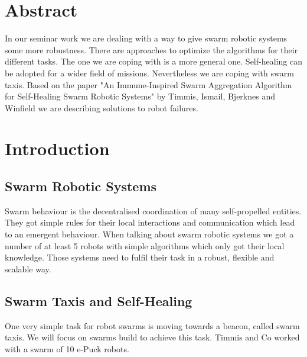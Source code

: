\documentclass[
	a4paper,
	article,
	pagesize,
	pdftex,
	12pt,
	english,
	fleqn,
	final,
	]{scrartcl}
\begin{document}

\makeTitel

\tableofcontents
\clearpage

\section{Abstract}
In our seminar work we are dealing with a way to give swarm robotic systems some more robustness. There are approaches to optimize the algorithms for their different tasks. The one we are coping with is a more general one. Self-healing can be adopted for a wider field of missions. Nevertheless we are coping with swarm taxis. Based on the paper "An Immune-Inspired Swarm Aggregation Algorithm for Self-Healing Swarm Robotic Systems" by Timmis, Ismail, Bjerknes and Winfield we are describing solutions to robot failures.

\section{Introduction}

\subsection{Swarm Robotic Systems}
Swarm behaviour is the decentralised coordination of many self-propelled entities. They got simple rules for their local interactions and communication which lead to an emergent behaviour. 
When talking about swarm robotic systems we got a number of at least 5 robots with simple algorithms which only got their local knowledge.
Those systems need to fulfil their task in a robust, flexible and scalable way.

\subsection{Swarm Taxis and Self-Healing}
One very simple task for robot swarms is moving towards a beacon, called swarm taxis. We will focus on swarms build to achieve this task. Timmis and Co worked with a swarm of 10 e-Puck robots.
\end{document}
